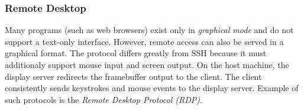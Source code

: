 \subsubsection{Remote Desktop}

Many programs (such as web browsers) exist only in \textit{graphical mode} and do not support a text-only interface.
However, remote access can also be served in a graphical format. The protocol differs greatly from SSH because
it must additionaly support mouse input and screen output. On the host machine, the display server redirects
the framebuffer output to the client. The client consistently sends keystrokes and mouse events to the display
server. Example of such protocols is the \textit{Remote Desktop Protocol (RDP)}.
